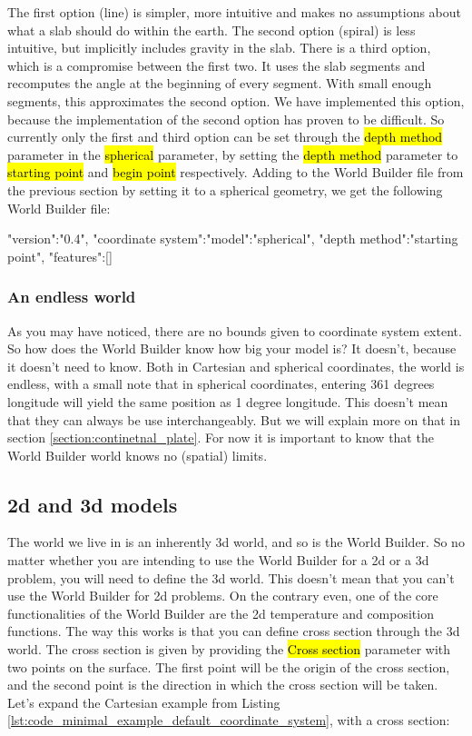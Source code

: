 \documentclass{book}
\newcommand{\WB}{{World Builder}}
\begin{document}
The first option (line) is simpler, more intuitive and makes no assumptions about what a slab should do within the earth. The second option (spiral) is less intuitive, but implicitly includes gravity in the slab. There is a third option, which is a compromise between the first two. It uses the slab segments and recomputes the angle at the beginning of every segment. With small enough segments, this approximates the second option. We have implemented this option, because the implementation of the second option has proven to be difficult. So currently only the first and third option can be set through the \hl{depth method} parameter in the \hl{spherical} parameter, by setting the \hl{depth method} parameter to \hl{starting point} and \hl{begin point} respectively. Adding to the \WB{} file from the previous section by setting it to a spherical geometry, we get the following \WB{} file:

\begin{javascriptcode}{}{}
{
  "version":"0.4",
  "coordinate system":{"model":"spherical", "depth method":"starting point"},
  "features":[]
}
\end{javascriptcode}


\subsubsection{An endless world}
As you may have noticed, there are no bounds given to coordinate system extent. So how does the \WB{} know how big your model is? It doesn't, because it doesn't need to know. Both in Cartesian and spherical coordinates, the world is endless, with a small note that in spherical coordinates, entering 361 degrees longitude will yield the same position as 1 degree longitude. This doesn't mean that they can always be use interchangeably. But we will explain more on that in section \ref{section:continetnal_plate}. For now it is important to know that the \WB{} world knows no (spatial) limits.

\subsection{2d and 3d models}
The world we live in is an inherently 3d world, and so is the \WB{}. So no matter whether you are intending to use the \WB{} for a 2d or a 3d problem, you will need to define the 3d world. This doesn't mean that you can't use the \WB{} for 2d problems. On the contrary even, one of the core functionalities of the \WB{} are the 2d temperature and composition functions. The way this works is that you can define cross section through the 3d world. The cross section is given by providing the \hl{Cross section} parameter with two points on the surface. The first point will be the origin of the cross section, and the second point is the direction in which the cross section will be taken. Let's expand the Cartesian example from Listing \ref{lst:code_minimal_example_default_coordinate_system}, with a cross section:
\end{document}
